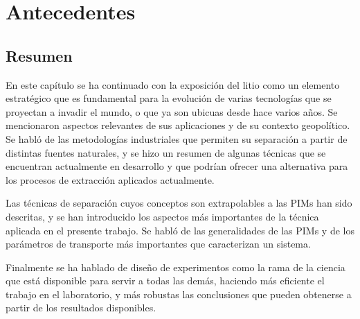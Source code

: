 \chapter{Antecedentes}%













\section{Resumen}
En este capítulo se ha continuado con la exposición del litio como un elemento estratégico que es fundamental para la evolución de varias tecnologías que se proyectan a invadir el mundo, o que ya son ubicuas desde hace varios años. Se mencionaron aspectos relevantes de sus aplicaciones y de su contexto geopolítico. Se habló de las metodologías industriales que permiten su separación a partir de distintas fuentes naturales, y se hizo un resumen de algunas técnicas que se encuentran actualmente en desarrollo y que podrían ofrecer una alternativa para los procesos de extracción aplicados actualmente.

Las técnicas de separación cuyos conceptos son extrapolables a las \ac{PIM}s han sido descritas, y se han introducido los aspectos más importantes de la técnica aplicada en el presente trabajo. Se habló de las generalidades de las \ac{PIM}s y de los parámetros de transporte más importantes que caracterizan un sistema.

Finalmente se ha hablado de diseño de experimentos como la rama de la ciencia que está disponible para servir a todas las demás, haciendo más eficiente el trabajo en el laboratorio, y más robustas las conclusiones que pueden obtenerse a partir de los resultados disponibles.

\clearpage
{}